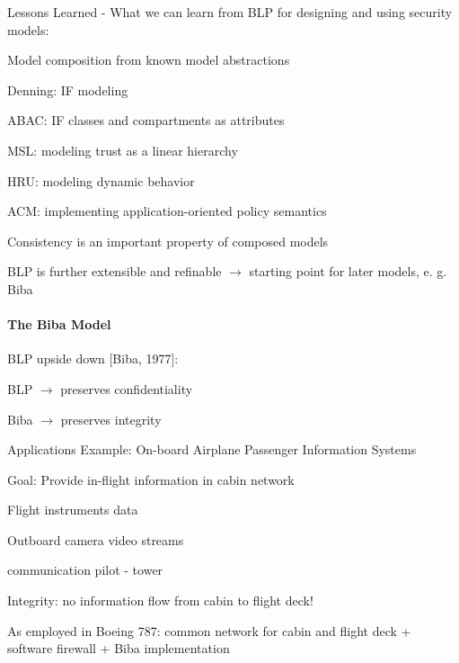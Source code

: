 \documentclass[a4paper]{article}
\begin{document}
\begin{multicols}{3}
    Lessons Learned - What we can learn from BLP for designing and using security models:
    \begin{itemize*}
        \item Model composition from known model abstractions
              \begin{itemize*}
                  \item Denning: IF modeling
                  \item ABAC: IF classes and compartments as attributes
                  \item MSL: modeling trust as a linear hierarchy
                  \item HRU: modeling dynamic behavior
                  \item ACM: implementing application-oriented policy semantics
              \end{itemize*}
        \item Consistency is an important property of composed models
        \item BLP is further extensible and refinable $\rightarrow$ starting point for later models, e. g. Biba
    \end{itemize*}


    \paragraph{The Biba Model}
    BLP upside down [Biba, 1977]:
    \begin{itemize*}
        \item BLP $\rightarrow$ preserves confidentiality
        \item Biba $\rightarrow$ preserves integrity
    \end{itemize*}

    Applications Example: On-board Airplane Passenger Information Systems
    \begin{itemize*}
        \item Goal: Provide in-flight information in cabin network
              \begin{itemize*}
                  \item Flight instruments data
                  \item Outboard camera video streams
                  \item communication pilot - tower
              \end{itemize*}
        \item Integrity: no information flow from cabin to flight deck!
        \item As employed in Boeing 787: common network for cabin and flight deck + software firewall + Biba implementation
    \end{itemize*}


\end{multicols}
\end{document}
